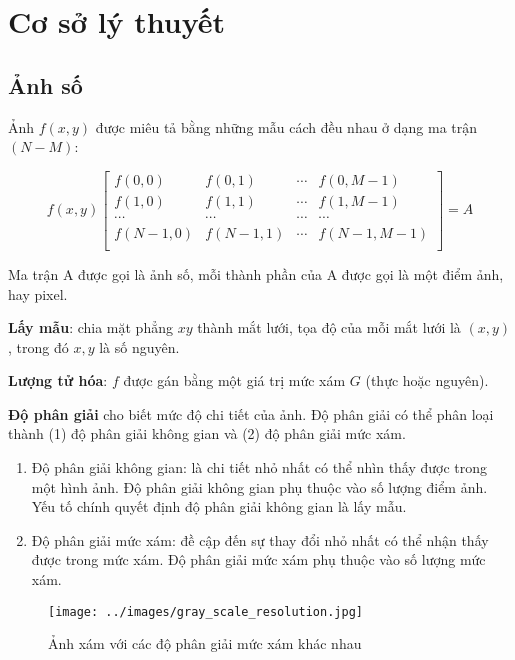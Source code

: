 \section{Cơ sở lý thuyết}

\subsection{Ảnh số}

Ảnh $f(x,y)$ được miêu tả bằng những mẫu cách đều nhau ở dạng ma trận $(N-M)$:

$$f(x,y) \begin{bmatrix}
f(0,0) & f(0,1) & \cdots & f(0,M-1) \\
f(1,0) & f(1,1) & \cdots & f(1,M-1) \\
\cdots & \cdots & \cdots & \cdots \\
f(N-1,0) & f(N-1,1) & \cdots & f(N-1,M-1) \\
\end{bmatrix} = A$$

Ma trận A được gọi là ảnh số, mỗi thành phần của A được gọi là một điểm ảnh, hay pixel.

\textbf{Lấy mẫu}: chia mặt phẳng $xy$ thành mắt lưới, tọa độ của mỗi mắt lưới là $(x,y)$, trong đó $x,y$ là số nguyên.

\textbf{Lượng tử hóa}: $f$ được gán bằng một giá trị mức xám $G$ (thực hoặc nguyên).

\textbf{Độ phân giải} cho biết mức độ chi tiết của ảnh. Độ phân giải có thể phân loại thành (1) độ phân giải không gian và (2) độ phân giải mức xám.

\begin{enumerate}
    \item Độ phân giải không gian: là chi tiết nhỏ nhất có thể nhìn thấy được trong một hình ảnh. 
    Độ phân giải không gian phụ thuộc vào số lượng điểm ảnh. 
    Yếu tố chính quyết định độ phân giải không gian là lấy mẫu.

    \item Độ phân giải mức xám: đề cập đến sự thay đổi nhỏ nhất có thể nhận thấy được trong mức xám.
    Độ phân giải mức xám phụ thuộc vào số lượng mức xám.
\end{enumerate}

\begin{figure}[H]
    \centering
    \texttt{[image: ../images/gray\_scale\_resolution.jpg]}
    \caption{Ảnh xám với các độ phân giải mức xám khác nhau}
    \label{fig:gray_scale_resolution}
\end{figure}

